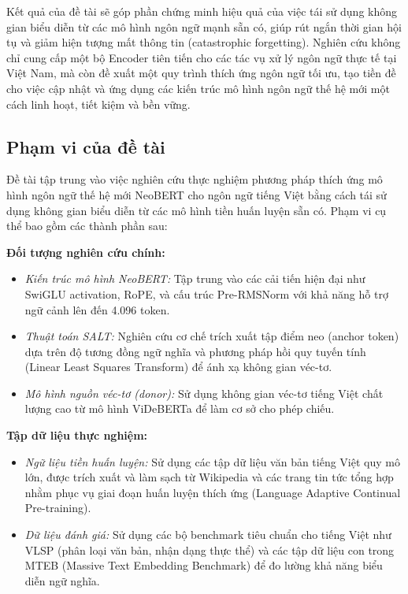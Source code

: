 \documentclass{article}[14pt]
\begin{document}
{    Kết quả của đề tài sẽ góp phần chứng minh hiệu quả của việc tái sử dụng không gian biểu diễn từ các mô hình ngôn ngữ mạnh sẵn có, giúp rút ngắn thời gian hội tụ và giảm hiện tượng mất thông tin (catastrophic forgetting). Nghiên cứu không chỉ cung cấp một bộ Encoder tiên tiến cho các tác vụ xử lý ngôn ngữ thực tế tại Việt Nam, mà còn đề xuất một quy trình thích ứng ngôn ngữ tối ưu, tạo tiền đề cho việc cập nhật và ứng dụng các kiến trúc mô hình ngôn ngữ thế hệ mới một cách linh hoạt, tiết kiệm và bền vững.
    
    \subsection{Phạm vi của đề tài}
    
    Đề tài tập trung vào việc nghiên cứu thực nghiệm phương pháp thích ứng mô hình ngôn ngữ thế hệ mới NeoBERT cho ngôn ngữ tiếng Việt bằng cách tái sử dụng không gian biểu diễn từ các mô hình tiền huấn luyện sẵn có. Phạm vi cụ thể bao gồm các thành phần sau:
    
    \textbf{Đối tượng nghiên cứu chính:}
    \begin{itemize}
        \item \textit{Kiến trúc mô hình NeoBERT:} Tập trung vào các cải tiến hiện đại như SwiGLU activation, RoPE, và cấu trúc Pre-RMSNorm với khả năng hỗ trợ ngữ cảnh lên đến 4.096 token.
        \item \textit{Thuật toán SALT:} Nghiên cứu cơ chế trích xuất tập điểm neo (anchor token) dựa trên độ tương đồng ngữ nghĩa và phương pháp hồi quy tuyến tính (Linear Least Squares Transform) để ánh xạ không gian véc-tơ.
        \item \textit{Mô hình nguồn véc-tơ (donor):} Sử dụng không gian véc-tơ tiếng Việt chất lượng cao từ mô hình ViDeBERTa để làm cơ sở cho phép chiếu.
    \end{itemize}
    
    \textbf{Tập dữ liệu thực nghiệm:}
    \begin{itemize}
        \item \textit{Ngữ liệu tiền huấn luyện:} Sử dụng các tập dữ liệu văn bản tiếng Việt quy mô lớn, được trích xuất và làm sạch từ Wikipedia và các trang tin tức tổng hợp nhằm phục vụ giai đoạn huấn luyện thích ứng (Language Adaptive Continual Pre-training).
        \item \textit{Dữ liệu đánh giá:} Sử dụng các bộ benchmark tiêu chuẩn cho tiếng Việt như VLSP (phân loại văn bản, nhận dạng thực thể) và các tập dữ liệu con trong MTEB (Massive Text Embedding Benchmark) để đo lường khả năng biểu diễn ngữ nghĩa.
    \end{itemize}
    
}
\end{document}
